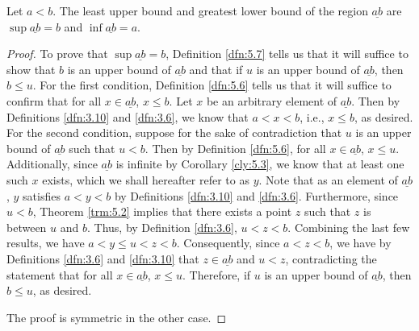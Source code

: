 \documentclass[../main.tex]{subfiles}
\begin{document}
\begin{theorem}\label{trm:5.12}
    Let $a<b$. The least upper bound and greatest lower bound of the region $\underline{ab}$ are $\sup\underline{ab}=b$ and $\inf\underline{ab}=a$.
    \begin{proof}
        To prove that $\sup\underline{ab}=b$, Definition \ref{dfn:5.7} tells us that it will suffice to show that $b$ is an upper bound of $\underline{ab}$ and that if $u$ is an upper bound of $\underline{ab}$, then $b\leq u$. For the first condition, Definition \ref{dfn:5.6} tells us that it will suffice to confirm that for all $x\in\underline{ab}$, $x\leq b$. Let $x$ be an arbitrary element of $\underline{ab}$. Then by Definitions \ref{dfn:3.10} and \ref{dfn:3.6}, we know that $a<x<b$, i.e., $x\leq b$, as desired. For the second condition, suppose for the sake of contradiction that $u$ is an upper bound of $\underline{ab}$ such that $u<b$. Then by Definition \ref{dfn:5.6}, for all $x\in\underline{ab}$, $x\leq u$. Additionally, since $\underline{ab}$ is infinite by Corollary \ref{cly:5.3}, we know that at least one such $x$ exists, which we shall hereafter refer to as $y$. Note that as an element of $\underline{ab}$, $y$ satisfies $a<y<b$ by Definitions \ref{dfn:3.10} and \ref{dfn:3.6}. Furthermore, since $u<b$, Theorem \ref{trm:5.2} implies that there exists a point $z$ such that $z$ is between $u$ and $b$. Thus, by Definition \ref{dfn:3.6}, $u<z<b$. Combining the last few results, we have $a<y\leq u<z<b$. Consequently, since $a<z<b$, we have by Definitions \ref{dfn:3.6} and \ref{dfn:3.10} that $z\in\underline{ab}$ and $u<z$, contradicting the statement that for all $x\in\underline{ab}$, $x\leq u$. Therefore, if $u$ is an upper bound of $\underline{ab}$, then $b\leq u$, as desired.\par
        The proof is symmetric in the other case.
    \end{proof}
\end{theorem}
\end{document}
